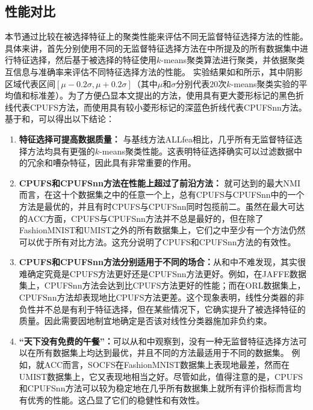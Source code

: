 \subsection{性能对比}
本节通过比较在被选择特征上的聚类性能来评估不同无监督特征选择方法的性能。
具体来讲，首先分别使用不同的无监督特征选择方法在中所提及的所有数据集中进行特征选择，然后基于被选择的特征使用$k$-means聚类算法进行聚类，并依据聚类互信息与准确率来评估不同特征选择方法的性能。
实验结果如和所示，其中阴影区域代表区间$[\mu-0.2\sigma,\mu+0.2\sigma]$（其中$\mu$和$\sigma$分别代表$20$次$k$-means聚类实验的平均值和标准差）。为了方便凸显本文提出的方法，使用具有更大菱形标记的黑色折线代表CPUFS方法，而使用具有较小菱形标记的深蓝色折线代表CPUFSnn方法。基于和，可以得出以下结论：
\begin{enumerate}
    \item \textbf{特征选择可提高数据质量：}
    与基线方法ALLfea相比，几乎所有无监督特征选择方法均具有更强的$k$-means聚类性能。这表明特征选择确实可以过滤数据中的冗余和嘈杂特征，因此具有非常重要的作用。
    \item \textbf{CPUFS和CPUFSnn方法在性能上超过了前沿方法：}
    就可达到的最大NMI而言，在这十个数据集之中的任意一个上，总有CPUFS与CPUFSnn中的一个方法是最优的，并且有时CPUFS与CPUFSnn同时包揽前二。虽然在最大可达的ACC方面，CPUFS与CPUFSnn方法并不总是最好的，但在除了FashionMNIST和UMIST之外的所有数据集上，它们之中至少有一个方法仍然可以优于所有对比方法。这充分说明了CPUFS和CPUFSnn方法的有效性。
    \item \textbf{CPUFS和CPUFSnn方法分别适用于不同的场合：}从和中不难发现，其实很难确定究竟是CPUFS方法更好还是CPUFSnn方法更好。例如，在JAFFE数据集上，CPUFSnn方法会达到比CPUFS方法更好的性能；而在ORL数据集上，CPUFSnn方法却表现地比CPUFS方法更差。这个现象表明，线性分类器的非负性并不总是有利于特征选择，但在某些情况下，它确实提升了被选择特征的质量。因此需要因地制宜地确定是否该对线性分类器施加非负约束。
    \item \textbf{“天下没有免费的午餐”：}可以从和中观察到，没有一种无监督特征选择方法可以在所有数据集上均达到最优，并且不同的方法最适用于不同的数据集。 例如，就ACC而言，SOCFS在FashionMNIST数据集上表现地最差，然而在UMIST数据集上，它又表现地相当之好。尽管如此，值得注意的是，CPUFS和CPUFSnn方法可以较为稳定地在几乎所有数据集上就所有评价指标而言均有优秀的性能。这凸显了它们的稳健性和有效性。
\end{enumerate}

